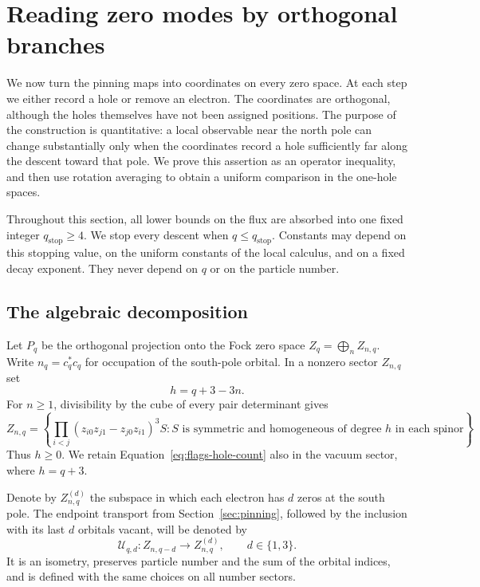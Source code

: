\section{Reading zero modes by orthogonal branches}
\label{sec:flags}

We now turn the pinning maps into coordinates on every zero space.  At
each step we either record a hole or remove an electron.  The coordinates
are orthogonal, although the holes themselves have not been assigned
positions.  The purpose of the construction is quantitative: a local
observable near the north pole can change substantially only when the
coordinates record a hole sufficiently far along the descent toward that
pole.  We prove this assertion as an operator inequality, and then use
rotation averaging to obtain a uniform comparison in the one-hole spaces.

Throughout this section, all lower bounds on the flux are absorbed into
one fixed integer $q_{\mathrm{stop}}\geq 4$.  We stop every descent when
$q\leq q_{\mathrm{stop}}$.  Constants may depend on this stopping value,
on the uniform constants of the local calculus, and on a fixed decay
exponent.  They never depend on $q$ or on the particle number.

\subsection{The algebraic decomposition}

Let $P_q$ be the orthogonal projection onto the Fock zero space
$Z_q=\bigoplus_n Z_{n,q}$.  Write $n_q=c_q^*c_q$ for occupation of the
south-pole orbital.  In a nonzero sector $Z_{n,q}$ set
\begin{equation}
 h=q+3-3n.
 \label{eq:flags-hole-count}
\end{equation}
For $n\geq 1$, divisibility by the cube of every pair determinant gives
\begin{equation}
 Z_{n,q}=\left\{
  \prod_{i<j}(z_{i0}z_{j1}-z_{j0}z_{i1})^3 S:
  S\text{ is symmetric and homogeneous of degree }h
       \text{ in each spinor}\right\}.
 \label{eq:flags-polynomial-space}
\end{equation}
Thus $h\geq0$.  We retain Equation~\eqref{eq:flags-hole-count} also in
the vacuum sector, where $h=q+3$.

Denote by $Z_{n,q}^{(d)}$ the subspace in which each electron has $d$
zeros at the south pole.  The endpoint transport from
Section~\ref{sec:pinning}, followed by the inclusion with its last $d$
orbitals vacant, will be denoted by
\[
 \mathcal U_{q,d}:Z_{n,q-d}\longrightarrow Z_{n,q}^{(d)},
 \qquad d\in\{1,3\}.
\]
It is an isometry, preserves particle number and the sum of the orbital
indices, and is defined with the same choices on all number sectors.

